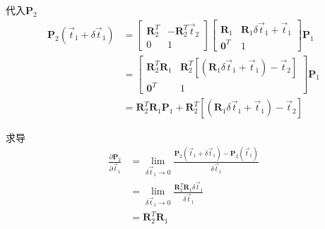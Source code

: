 \documentclass{article}
\begin{document}
代入$\boldsymbol{P}_2$
\begin{equation}
	\begin{aligned}
		\boldsymbol{P}_2(\vec{t}_1+\delta \vec{t}_1) & =                                                                           
		\left[ 
		\begin{matrix} 
		\boldsymbol{R}_2^{T}                         & -\boldsymbol{R}_2^{T}\vec{t}_2                                              \\
		0                                            & 1                                                                           
		\end{matrix} 
		\right]
		\left[ 
		\begin{matrix}
		\boldsymbol{R}_1                             & \boldsymbol{R}_1\delta \vec{t}_1+\vec{t}_1                                  \\
		\boldsymbol{0}^T                             & 1                                                                           
		\end{matrix}
		\right]   \boldsymbol{P}_1\\&=
		\left[ 
		\begin{matrix}
		\boldsymbol{R}_2^{T} \boldsymbol{R}_1        & \boldsymbol{R}_2^{T}[(\boldsymbol{R}_1\delta\vec{t}_1+\vec{t}_1)-\vec{t}_2] \\ 
		\boldsymbol{0}^T                             & 1                                                                           
		\end{matrix}
		\right] 
		\boldsymbol{P}_1 \\&= 
		\boldsymbol{R}_2^{T} \boldsymbol{R}_1\boldsymbol{P}_1 +\boldsymbol{R}_2^{T}[(\boldsymbol{R}_1\delta\vec{t}_1+\vec{t}_1)-\vec{t}_2]
	\end{aligned}
\end{equation}

求导
\begin{equation}
	\begin{aligned}
		\frac{\partial{\boldsymbol{P}_2}}{\partial{\vec{t}_1}} & = 
		\lim_{\delta \vec{t}_1\rightarrow0}
		\frac{\boldsymbol{P}_2(\vec{t}_1+\delta \vec{t}_1)-\boldsymbol{P}_2(\vec{t}_1)}
		{\delta \vec{t}_1}\\&=
		\lim_{\delta \vec{t}_1\rightarrow0}
		\frac{\boldsymbol{R}_2^{T}\boldsymbol{R}_1\delta\vec{t}_1}
		{\delta \vec{t}_1}\\&=
		\boldsymbol{R}_2^{T}\boldsymbol{R}_1
	\end{aligned}
\end{equation}
\end{document}
